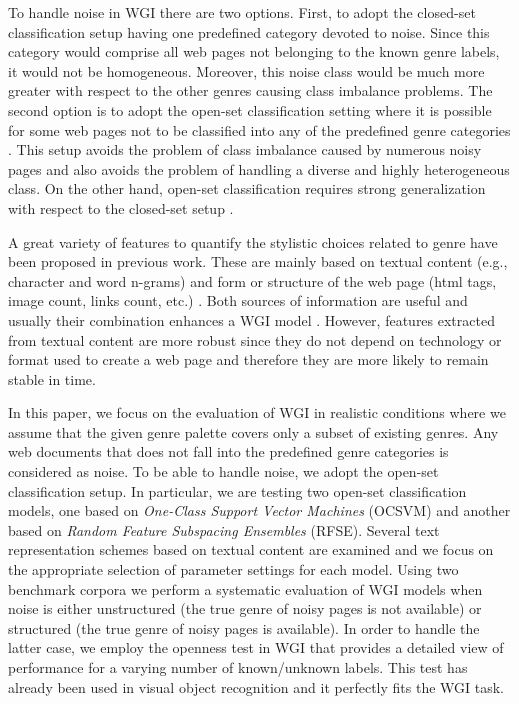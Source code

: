 \documentclass[runningheads]{llncs}
\begin{document}
To handle noise in WGI there are two options. First, to adopt the closed-set classification setup having one predefined category devoted to noise. Since this category would comprise all web pages not belonging to the known genre labels, it would not be homogeneous. Moreover, this noise class would be much more greater with respect to the other genres causing class imbalance problems. The second option is to adopt the open-set classification setting where it is possible for some web pages not to be classified into any of the predefined genre categories \citep{pritsos2013open}. This setup avoids the problem of class imbalance caused by numerous noisy pages and also avoids the problem of handling a diverse and highly heterogeneous class. On the other hand, open-set classification requires strong generalization with respect to the closed-set setup \citep{scheirer2013toward}.

A great variety of features to quantify the stylistic choices related to genre have been proposed in previous work. These are mainly based on textual content (e.g., character and word n-grams) \citep{mason2009distance,Sharroff2010} and form or structure of the web page (html tags, image count, links count, etc.) \citep{Lim2005,levering2008using}. Both sources of information are useful and usually their combination enhances a WGI model \citep{kanaris2009learning}. However, features extracted from textual content are more robust since they do not depend on technology or format used to create a web page and therefore they are more likely to remain stable in time.

In this paper, we focus on the evaluation of WGI in realistic conditions where we assume that the given genre palette covers only a subset of existing genres. Any web documents that does not fall into the predefined genre categories is considered as noise. To be able to handle noise, we adopt the open-set classification setup. In particular, we are testing two open-set classification models, one based on \textit{One-Class Support Vector Machines} (OCSVM) and another based on \textit{Random Feature Subspacing Ensembles} (RFSE). Several text representation schemes based on textual content are examined and we focus on the appropriate selection of parameter settings for each model. Using two benchmark corpora we perform a systematic evaluation of WGI models when noise is either unstructured (the true genre of noisy pages is not available) or structured (the true genre of noisy pages is available). In order to handle the latter case, we employ the openness test in WGI that provides a detailed view of performance for a varying number of known/unknown labels. This test has already been used in visual object recognition \citep{scheirer2013toward} and it perfectly fits the WGI task.
\end{document}
